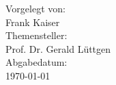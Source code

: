 \begin{titlepage}
 \vspace{2cm}
 

\large{Vorgelegt von:}\\[0.0cm]
\LARGE{Frank Kaiser}\\[0.3cm]

\large{Themensteller:}\\
\large{Prof. Dr. Gerald Lüttgen}\\[0.3cm]


\large{Abgabedatum:}\\
{\large \today}\\[2cm] %



 

\vfill %

\end{titlepage}